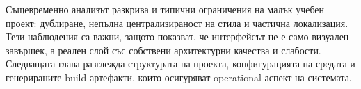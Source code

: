 Същевременно анализът разкрива и типични ограничения на малък учебен проект: дублиране, непълна централизираност на стила и частична локализация. Тези наблюдения са важни, защото показват, че интерфейсът не е само визуален завършек, а реален слой със собствени архитектурни качества и слабости. Следващата глава разглежда структурата на проекта, конфигурацията на средата и генерираните build артефакти, които осигуряват operational аспект на системата.
